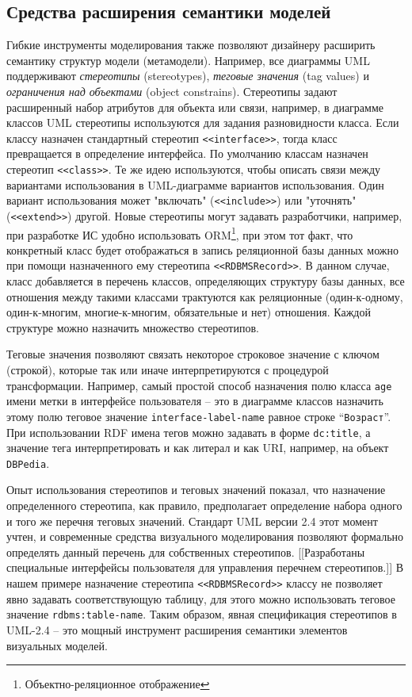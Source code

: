 \documentclass[conference]{IEEEtran} \IEEEoverridecommandlockouts
\begin{document}
\subsection{Средства расширения семантики моделей} \label{sec:mod-ext} 

Гибкие инструменты моделирования также позволяют дизайнеру расширить семантику структур модели (метамодели). Например, все диаграммы UML поддерживают \emph{стереотипы} (stereotypes), \emph{теговые значения} (tag values) и \emph{ограничения над объектами} (object constrains). Стереотипы задают расширенный набор атрибутов для объекта или связи, например, в диаграмме классов UML стереотипы используются для задания разновидности класса. Если классу назначен стандартный стереотип \texttt{<<interface>>}, тогда класс превращается в определение интерфейса. По умолчанию классам назначен стереотип \texttt{<<class>>}. Те же идею используются, чтобы описать связи между вариантами использования в UML-диаграмме вариантов использования. Один вариант использования может "включать" (\texttt{<<include>>}) или "уточнять" (\texttt{<<extend>>}) другой. Новые стереотипы могут задавать разработчики, например, при разработке ИС удобно использовать ORM\footnote{Объектно-реляционное отображение}, при этом тот факт, что конкретный класс будет отображаться в запись реляционной базы данных можно при помощи назначенного ему стереотипа \texttt{<<RDBMSRecord>>}. В данном случае, класс добавляется в перечень классов, определяющих структуру базы данных, все отношения между такими классами трактуются как реляционные (один-к-одному, один-к-многим, многие-к-многим, обязательные и нет) отношения. Каждой структуре можно назначить множество стереотипов. 

Теговые значения позволяют связать некоторое строковое значение с ключом (строкой), которые так или иначе интерпретируются с процедурой трансформации. Например, самый простой способ назначения полю класса \texttt{age} имени метки в интерфейсе пользователя -- это в диаграмме классов назначить этому полю теговое значение \texttt{interface-label-name} равное строке ``\texttt{Возраст}''. При использовании RDF имена тегов можно задавать в форме \texttt{dc:title}, а значение тега интерпретировать и как литерал и как URI, например, на объект \texttt{DBPedia}. 

Опыт использования стереотипов и теговых значений показал, что назначение определенного стереотипа, как правило, предполагает определение набора одного и того же перечня теговых значений. Стандарт UML версии 2.4 этот момент учтен, и современные средства визуального моделирования позволяют формально определять данный перечень для собственных стереотипов. [[Разработаны специальные интерфейсы пользователя для управления перечнем стереотипов.]] В нашем примере назначение стереотипа \texttt{<<RDBMSRecord>>} классу не позволяет явно задавать соответствующую таблицу, для этого можно использовать теговое значение \texttt{rdbms:table-name}. Таким образом, явная спецификация стереотипов в UML-2.4 -- это мощный инструмент расширения семантики элементов визуальных моделей. 
\end{document}
